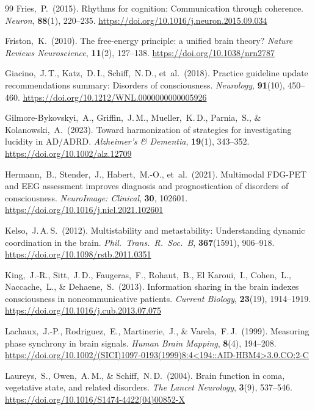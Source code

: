﻿\documentclass[11pt,a4paper]{article}
\theoremstyle{plain}
\theoremstyle{definition}
\theoremstyle{remark}
\begin{document}
\begin{thebibliography}{99}
Fries,~P.\ (2015).
Rhythms for cognition: Communication through coherence.
\textit{Neuron}, \textbf{88}(1), 220--235.
\url{https://doi.org/10.1016/j.neuron.2015.09.034}

Friston,~K.\ (2010).
The free-energy principle: a unified brain theory?
\textit{Nature Reviews Neuroscience}, \textbf{11}(2), 127--138.
\url{https://doi.org/10.1038/nrn2787}

Giacino,~J.\,T., Katz,~D.\,I., Schiff,~N.\,D., et~al.\ (2018).
Practice guideline update recommendations summary: Disorders of consciousness.
\textit{Neurology}, \textbf{91}(10), 450--460.
\url{https://doi.org/10.1212/WNL.0000000000005926}

Gilmore-Bykovskyi,~A., Griffin,~J.\,M., Mueller,~K.\,D., Parnia,~S., \& Kolanowski,~A.\ (2023).
Toward harmonization of strategies for investigating lucidity in AD/ADRD.
\textit{Alzheimer's \& Dementia}, \textbf{19}(1), 343--352.
\url{https://doi.org/10.1002/alz.12709}

Hermann,~B., Stender,~J., Habert,~M.-O., et~al.\ (2021).
Multimodal FDG-PET and EEG assessment improves diagnosis and prognostication of disorders of consciousness.
\textit{NeuroImage: Clinical}, \textbf{30}, 102601.
\url{https://doi.org/10.1016/j.nicl.2021.102601}

Kelso,~J.\,A.\,S.\ (2012).
Multistability and metastability: Understanding dynamic coordination in the brain.
\textit{Phil.\ Trans.\ R.\ Soc.\ B}, \textbf{367}(1591), 906--918.
\url{https://doi.org/10.1098/rstb.2011.0351}

King,~J.-R., Sitt,~J.\,D., Faugeras,~F., Rohaut,~B., El Karoui,~I., Cohen,~L., Naccache,~L., \& Dehaene,~S.\ (2013).
Information sharing in the brain indexes consciousness in noncommunicative patients.
\textit{Current Biology}, \textbf{23}(19), 1914--1919.
\url{https://doi.org/10.1016/j.cub.2013.07.075}

Lachaux,~J.-P., Rodriguez,~E., Martinerie,~J., \& Varela,~F.\,J.\ (1999).
Measuring phase synchrony in brain signals.
\textit{Human Brain Mapping}, \textbf{8}(4), 194--208.
\url{https://doi.org/10.1002/(SICI)1097-0193(1999)8:4<194::AID-HBM4>3.0.CO;2-C}

Laureys,~S., Owen,~A.\,M., \& Schiff,~N.\,D.\ (2004).
Brain function in coma, vegetative state, and related disorders.
\textit{The Lancet Neurology}, \textbf{3}(9), 537--546.
\url{https://doi.org/10.1016/S1474-4422(04)00852-X}


\end{thebibliography}
\end{document}
